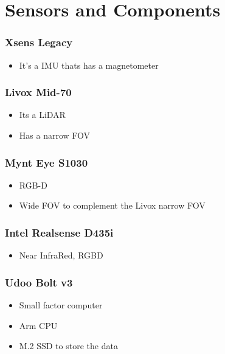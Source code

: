 \section{Sensors and Components}

\subsubsection*{Xsens Legacy}

\begin{itemize}
    \item It's a IMU thats has a magnetometer
\end{itemize}

\subsubsection*{Livox Mid-70}

\begin{itemize}
    \item Its a LiDAR
    \item Has a narrow FOV
\end{itemize}

\subsubsection*{Mynt Eye S1030}

\begin{itemize}
    \item RGB-D
    \item Wide FOV to complement the Livox narrow FOV
\end{itemize}

\subsubsection*{Intel Realsense D435i}

\begin{itemize}
    \item Near InfraRed, RGBD
\end{itemize}

\subsubsection*{Udoo Bolt v3}

\begin{itemize}
    \item Small factor computer 
    \item Arm CPU
    \item M.2 SSD to store the data
\end{itemize}

